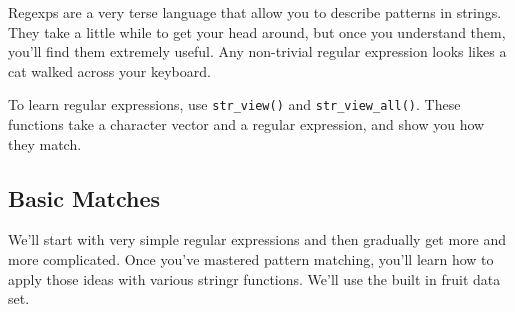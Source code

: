 \documentclass[]{book}
\theoremstyle{definition}
\theoremstyle{definition}
\theoremstyle{definition}
\theoremstyle{remark}
\let\BeginKnitrBlock\begin \let\EndKnitrBlock\end
\begin{document}
Regexps are a very terse language that allow you to describe patterns in
strings. They take a little while to get your head around, but once you
understand them, you'll find them extremely useful. Any non-trivial
regular expression looks likes a cat walked across your keyboard.

\BeginKnitrBlock{rmdtip}
To learn regular expressions, use \texttt{str\_view()} and
\texttt{str\_view\_all()}. These functions take a character vector and a
regular expression, and show you how they match.
\EndKnitrBlock{rmdtip}

\subsection{Basic Matches}\label{basic-matches}

We'll start with very simple regular expressions and then gradually get
more and more complicated. Once you've mastered pattern matching, you'll
learn how to apply those ideas with various stringr functions. We'll use
the built in fruit data set.
\end{document}
